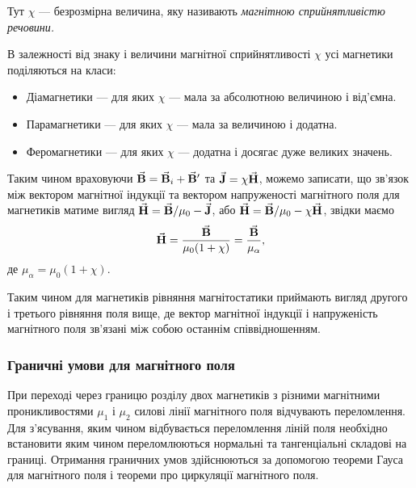 \begin{definition}
	Тут $\chi$ --- безрозмірна величина, яку називають \it{магнітною сприйнятливістю речовини}.
\end{definition}

В залежності від знаку і величини магнітної сприйнятливості $\chi$ усі магнетики поділяються на класи:
\begin{itemize}
	\item Діамагнетики --- для яких $\chi$ --- мала за абсолютною величиною і від'ємна.
	\item Парамагнетики --- для яких $\chi$ --- мала за величиною і додатна.
	\item Феромагнетики --- для яких $\chi$ --- додатна і досягає дуже великих значень.
\end{itemize}

Таким чином враховуючи ${\vec{\mathbf{B}}} = {\vec{\mathbf{B}}}_i + {\vec{\mathbf{B}}}'$ та ${\vec{\mathbf{J}}} = \chi {\vec{\mathbf{H}}}$, можемо записати, що зв'язок між вектором магнітної індукції та вектором напруженості магнітного поля для магнетиків матиме вигляд ${\vec{\mathbf{H}}} = {\vec{\mathbf{B}}} / \mu_0 - {\vec{\mathbf{J}}}$, або ${\vec{\mathbf{H}}} = {\vec{\mathbf{B}}} / \mu_0 - \chi {\vec{\mathbf{H}}}$, звідки маємо 
\begin{equation}
	{\vec{\mathbf{H}}} = \frac{{\vec{\mathbf{B}}}}{\mu_0 (1 + \chi)} = \frac{{\vec{\mathbf{B}}}}{\mu_\alpha},
\end{equation}
де $\mu_\alpha = \mu_0 (1 + \chi)$. \medskip

Таким чином для магнетиків рівняння магнітостатики приймають вигляд другого і третього рівняння поля вище, де вектор магнітної індукції і напруженість магнітного поля зв'язані між собою останнім співвідношенням.

\subsubsection{Граничні умови для магнітного поля}

При переході через границю розділу двох магнетиків з різними магнітними проникливостями $\mu_1$ і $\mu_2$ силові лінії магнітного поля відчувають переломлення. Для з'ясування, яким чином  відбувається переломлення ліній поля необхідно встановити яким чином переломлюються нормальні та тангенціальні складові на границі. Отримання граничних умов здійснюються за допомогою теореми Гауса для магнітного поля і теореми про циркуляції магнітного поля. \medskip

